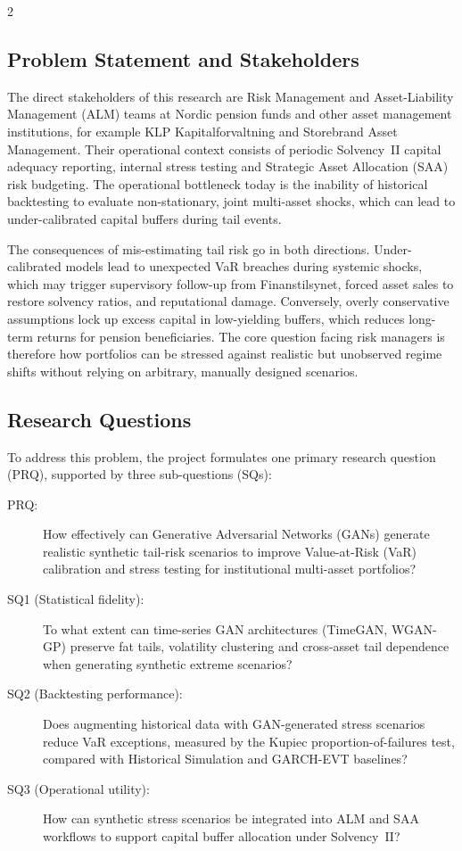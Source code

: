 \documentclass[12pt]{spieman}  %
\begin{document}
\begin{spacing}{2}
\subsection{Problem Statement and Stakeholders}
\label{sect:problem}

The direct stakeholders of this research are Risk Management and Asset-Liability Management (ALM) teams at Nordic pension funds and other asset management institutions, for example KLP Kapitalforvaltning and Storebrand Asset Management. Their operational context consists of periodic Solvency~II capital adequacy reporting, internal stress testing and Strategic Asset Allocation (SAA) risk budgeting. The operational bottleneck today is the inability of historical backtesting to evaluate non-stationary, joint multi-asset shocks, which can lead to under-calibrated capital buffers during tail events.

The consequences of mis-estimating tail risk go in both directions. Under-calibrated models lead to unexpected VaR breaches during systemic shocks, which may trigger supervisory follow-up from Finanstilsynet, forced asset sales to restore solvency ratios, and reputational damage. Conversely, overly conservative assumptions lock up excess capital in low-yielding buffers, which reduces long-term returns for pension beneficiaries. The core question facing risk managers is therefore how portfolios can be stressed against realistic but unobserved regime shifts without relying on arbitrary, manually designed scenarios.

\subsection{Research Questions}
\label{sect:rq}

To address this problem, the project formulates one primary research question (PRQ), supported by three sub-questions (SQs):

\begin{description}
\item[PRQ:] How effectively can Generative Adversarial Networks (GANs) generate realistic synthetic tail-risk scenarios to improve Value-at-Risk (VaR) calibration and stress testing for institutional multi-asset portfolios?
\item[SQ1 (Statistical fidelity):] To what extent can time-series GAN architectures (TimeGAN, WGAN-GP) preserve fat tails, volatility clustering and cross-asset tail dependence when generating synthetic extreme scenarios?
\item[SQ2 (Backtesting performance):] Does augmenting historical data with GAN-generated stress scenarios reduce VaR exceptions, measured by the Kupiec proportion-of-failures test, compared with Historical Simulation and GARCH-EVT baselines?
\item[SQ3 (Operational utility):] How can synthetic stress scenarios be integrated into ALM and SAA workflows to support capital buffer allocation under Solvency~II?
\end{description}


\end{spacing}
\end{document}
